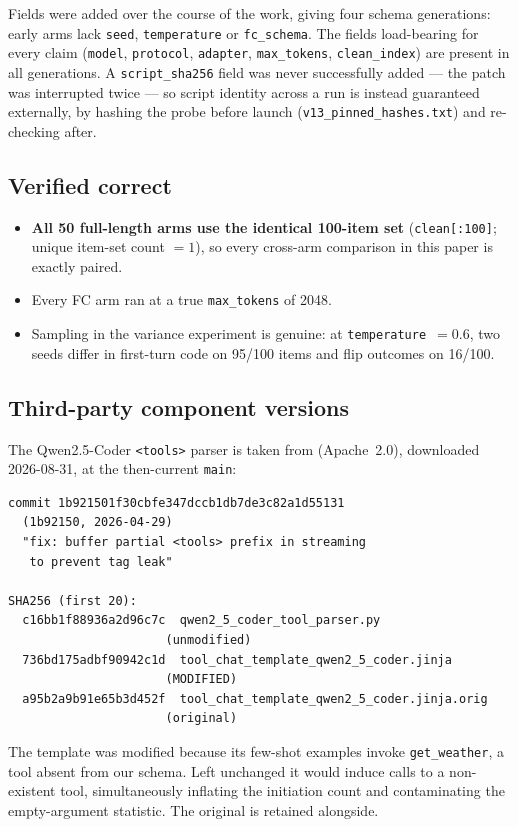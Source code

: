 Fields were added over the course of the work, giving four schema generations: early arms
lack \texttt{seed}, \texttt{temperature} or \texttt{fc\_schema}. The fields load-bearing for
every claim (\texttt{model}, \texttt{protocol}, \texttt{adapter}, \texttt{max\_tokens},
\texttt{clean\_index}) are present in all generations. A \texttt{script\_sha256} field was
never successfully added --- the patch was interrupted twice --- so script identity across a
run is instead guaranteed externally, by hashing the probe before launch
(\texttt{v13\_pinned\_hashes.txt}) and re-checking after.

\subsection{Verified correct}

\begin{itemize}
\tightlist
\item \textbf{All 50 full-length arms use the identical 100-item set}
      (\texttt{clean[:100]}; unique item-set count $=1$), so every cross-arm comparison in
      this paper is exactly paired.
\item Every FC arm ran at a true \texttt{max\_tokens} of 2048.
\item Sampling in the variance experiment is genuine: at \texttt{temperature}~$=0.6$, two
      seeds differ in first-turn code on 95/100 items and flip outcomes on 16/100.
\end{itemize}

\subsection{Third-party component versions}

The Qwen2.5-Coder \texttt{<tools>} parser is taken from
 (Apache~2.0), downloaded 2026-08-31, at the
then-current \texttt{main}:

{\footnotesize
\begin{verbatim}
commit 1b921501f30cbfe347dccb1db7de3c82a1d55131
  (1b92150, 2026-04-29)
  "fix: buffer partial <tools> prefix in streaming
   to prevent tag leak"

SHA256 (first 20):
  c16bb1f88936a2d96c7c  qwen2_5_coder_tool_parser.py
                      (unmodified)
  736bd175adbf90942c1d  tool_chat_template_qwen2_5_coder.jinja
                      (MODIFIED)
  a95b2a9b91e65b3d452f  tool_chat_template_qwen2_5_coder.jinja.orig
                      (original)
\end{verbatim}
}

The template was modified because its few-shot examples invoke \texttt{get\_weather}, a
tool absent from our schema. Left unchanged it would induce calls to a non-existent tool,
simultaneously inflating the initiation count and contaminating the empty-argument
statistic. The original is retained alongside.
